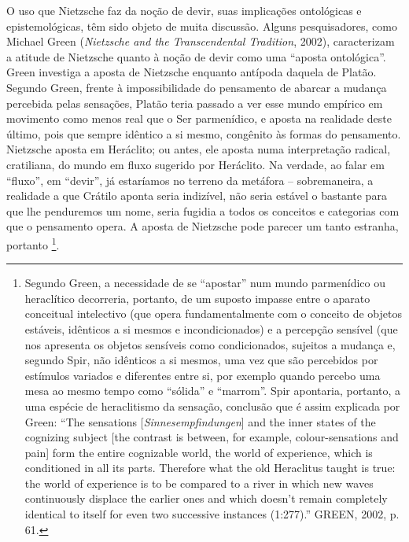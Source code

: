 \documentclass[
	12pt,				%
	openright,			%
	oneside,			%
	a4paper,			%
	english,			%
	french,				%
	spanish,			%
	brazil				%
	]{abntex2}
\begin{document}
O uso que Nietzsche faz da noção de devir, suas implicações ontológicas e epistemológicas, têm sido objeto de muita discussão. Alguns pesquisadores, como Michael Green (\textit{Nietzsche and the Transcendental Tradition}, 2002), caracterizam a atitude de Nietzsche quanto à noção de devir como uma “aposta ontológica”. Green investiga a aposta de Nietzsche enquanto antípoda daquela de Platão. Segundo Green, frente à impossibilidade do pensamento de abarcar a mudança percebida pelas sensações, Platão teria passado a ver esse mundo empírico em movimento como menos real que o Ser parmenídico, e aposta na realidade deste último, pois que sempre idêntico a si mesmo, congênito às formas do pensamento. Nietzsche aposta em Heráclito; ou antes, ele aposta numa interpretação radical, cratiliana, do mundo em fluxo sugerido por Heráclito. Na verdade, ao falar em “fluxo”, em “devir”, já estaríamos no terreno da metáfora – sobremaneira, a realidade a que Crátilo aponta seria indizível, não seria estável o bastante para que lhe penduremos um nome, seria fugidia a todos os conceitos e categorias com que o pensamento opera. A aposta de Nietzsche pode parecer um tanto estranha, portanto
\footnote{Segundo Green, a necessidade de se “apostar” num mundo parmenídico ou heraclítico decorreria, portanto, de um suposto impasse entre o aparato conceitual intelectivo (que opera fundamentalmente com o conceito de objetos estáveis, idênticos a si mesmos e incondicionados) e a percepção sensível (que nos apresenta os objetos sensíveis como condicionados, sujeitos a mudança e, segundo Spir, não idênticos a si mesmos, uma vez que são percebidos por estímulos variados e diferentes entre si, por exemplo quando percebo uma mesa ao mesmo tempo como “sólida” e “marrom”. Spir apontaria, portanto, a uma espécie de heraclitismo da sensação, conclusão que é assim explicada por Green: “The sensations [\textit{Sinnesempfindungen}] and the inner states of the cognizing subject [the contrast is between, for example, colour-sensations and pain] form the entire cognizable world, the world of experience, which is conditioned in all its parts. Therefore what the old Heraclitus taught is true: the world of experience is to be compared to a river in which new waves continuously displace the earlier ones and which doesn’t remain completely identical to itself for even two successive instances (1:277).” GREEN, 2002, p. 61.}.
\end{document}
